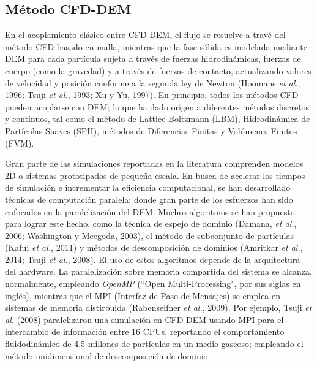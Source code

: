 \begin{center}
	\section{M\'etodo CFD-DEM}
\end{center}

\noindent
\justify

En el acoplamiento cl\'asico entre CFD-DEM, el flujo se resuelve a trav\'e del m\'etodo CFD basado en malla, mientras que la fase s\'olida es modelada mediante DEM para cada part\'icula sujeta a trav\'es de fuerzas hidrodin\'amicas, fuerzas de cuerpo (como la gravedad) y a trav\'es de fuerzas de contacto, actualizando valores de velocidad y posici\'on conforme a la segunda ley de Newton (Hoomans \textit{et al.}, 1996; Tsuji \textit{et al.}, 1993; Xu y Yu, 1997). En principio, todos los m\'etodos CFD pueden acoplarse con DEM; lo que ha dado origen a diferentes m\'etodos discretos y continuos, tal como el m\'etodo de Lattice Boltzmann (LBM), Hidrodin\'amica de Part\'iculas Suaves (SPH), m\'etodos de Diferencias Finitas y Vol\'umenes Finitos (FVM).

\noindent
\justify

Gran parte de las simulaciones reportadas en la literatura comprenden modelos 2D o sistemas prototipados de peque\~na escala. En busca de acelerar los tiempos de simulaci\'on e incrementar la eficiencia computacional, se han desarrollado t\'ecnicas de computaci\'on paralela; donde gran parte de los esfuerzos han sido enfocados en la paralelizaci\'on del DEM. Muchos algoritmos se han propuesto para lograr este hecho, como la t\'ecnica de espejo de dominio (Damana, \textit{et al.}, 2006; Washington y Meegoda, 2003), el m\'etodo de subconjunto de part\'iculas (Kafui \textit{et al.}, 2011) y m\'etodos de descomposici\'on de dominios (Amritkar \textit{et al.}, 2014; Tsuji \textit{et al.}, 2008). El uso de estos algoritmos depende de la arquitectura del hardware. La paralelizaci\'on sobre memoria compartida del sistema se alcanza, normalmente, empleando \textit{OpenMP} (``Open Multi-Processing", por sus siglas en ingl\'es), mientras que el MPI (Interfaz de Paso de Mensajes) se emplea en sistemas de memoria distirbuida (Rabenseifner \textit{et al.}, 2009). Por ejemplo, Tsuji \textit{et al.} (2008) paralelizaron una simulaci\'on en CFD-DEM usando MPI para el intercambio de informaci\'on entre 16 CPUs, reportando el comportamiento fluidodin\'amico de 4.5 millones de part\'iculas en un medio gaseoso; empleando el m\'etodo unidimensional de descomposici\'on de dominio.

